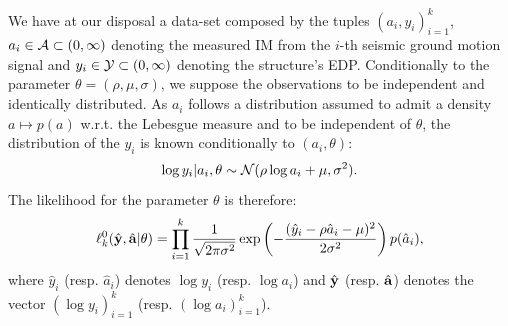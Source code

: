 We have at our disposal a data-set composed by the tuples $(a_i,y_i)_{i=1}^k$, $a_i\in\mathcal{A}\subset(0,\infty)$ denoting the measured IM from {the $i$-th seismic ground motion} signal and $y_i\in\mathcal{Y}\subset(0,\infty)$ denoting the structure's EDP. Conditionally to the parameter $\theta=(\rho,\mu,\sigma)$, we suppose the observations to be independent and identically distributed. As $a_i$ follows a distribution assumed to admit a density $a\mapsto p(a)$ w.r.t.{ }the Lebesgue measure and to be independent of $\theta$, the distribution of the $y_i$ is known conditionally to $(a_i,\theta)$:
    \begin{equation}
        \log y_i|a_i,\theta \sim \mathcal{N}(\rho\log a_i+\mu,\sigma^2)    .
    \end{equation}
The likelihood for the parameter $\theta$ is therefore:
    \begin{equation}
        \ell_k^0(\hat{\mathbf{y}},\hat{\mathbf{a}}|\theta) = \prod_{i=1}^k \frac{1}{\sqrt{2\pi\sigma^2}}\exp\left( -\frac{(\hat y_i-\rho\hat a_i-\mu)^2}{2\sigma^2} \right)p(\hat a_i),
    \end{equation}
where $\hat y_i$ (resp. $\hat a_i$) denotes $\log y_i$ (resp. $\log a_i$) and $\hat{\mathbf{y}}$ (resp. $\hat{\mathbf{a}}$) denotes the vector $(\log y_i)_{i=1}^k$ (resp. $(\log a_i)_{i=1}^k$).

